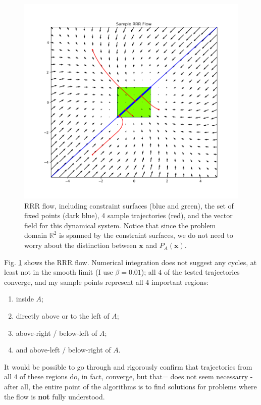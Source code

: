 \documentclass[psamsfonts]{amsart}
\theoremstyle{definition}
\theoremstyle{remark}
\numberwithin{equation}{section}
\begin{document}
\begin{figure}[H]
\centering
\includegraphics[width=\textwidth]{RRR_flow_final.png}
\caption{RRR flow, 
including constraint surfaces (blue and green), 
the set of fixed points (dark blue), 
4 sample trajectories (red), 
and the vector field for this dynamical system. 
Notice that since the problem domain $\mathbb{R}^2$ is spanned by the constraint surfaces, 
we do not need to worry about the distinction between $\mathbf{x}$ and $P_A(\mathbf{x})$.}
\label{fig2}
\end{figure}


Fig. \ref{fig2} shows the RRR flow. 
Numerical integration does not suggest any cycles, at least not in the smooth limit (I use $\beta = 0.01$); 
all $4$ of the tested trajectories converge, and my sample points represent all $4$ important regions:
\begin{enumerate}
\item
inside $A$; 
\item
directly above or to the left of $A$; 
\item
above-right /  below-left of $A$; 
\item
and above-left / below-right of $A$.
\end{enumerate}

It would be possible to go through and rigorously confirm that trajectories from all $4$ of these regions do, in fact, converge, 
but that= does not seem necessarry - after all, the entire point of the algorithms is to find solutions for problems where the 
flow is \textbf{not} fully understood.
\end{document}
